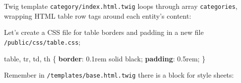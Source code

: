 \documentclass[a4paperpaper,openright]{book}
\newenvironment{Shaded}{}{}
\newcommand{\ConstantTok}[1]{\textcolor[rgb]{0.53,0.00,0.00}{#1}}
\newcommand{\DataTypeTok}[1]{\textcolor[rgb]{0.56,0.13,0.00}{#1}}
\newcommand{\DecValTok}[1]{\textcolor[rgb]{0.25,0.63,0.44}{#1}}
\newcommand{\KeywordTok}[1]{\textcolor[rgb]{0.00,0.44,0.13}{\textbf{#1}}}
\newcommand{\NormalTok}[1]{#1}
\newcommand{\OperatorTok}[1]{\textcolor[rgb]{0.40,0.40,0.40}{#1}}
\newcommand{\OtherTok}[1]{\textcolor[rgb]{0.00,0.44,0.13}{#1}}
\newcommand{\StringTok}[1]{\textcolor[rgb]{0.25,0.44,0.63}{#1}}
\begin{document}
Twig template \texttt{category/index.html.twig} loops through array
\texttt{categories}, wrapping HTML table row tags around each entity's
content:

\begin{Shaded}
\end{Shaded}

Let's create a CSS file for table borders and padding in a new file
\texttt{/public/css/table.css};

\begin{Shaded}
\begin{Highlighting}[]
\NormalTok{    table}\OperatorTok{,}\NormalTok{ tr}\OperatorTok{,}\NormalTok{ td}\OperatorTok{,}\NormalTok{ th \{}
        \KeywordTok{border}\NormalTok{: }\DecValTok{0.1}\DataTypeTok{rem} \DecValTok{solid} \ConstantTok{black}\OperatorTok{;}
        \KeywordTok{padding}\NormalTok{: }\DecValTok{0.5}\DataTypeTok{rem}\OperatorTok{;}
\NormalTok{    \}}
\end{Highlighting}
\end{Shaded}

Remember in \texttt{/templates/base.html.twig} there is a block for
style sheets:

\begin{Shaded}
\end{Shaded}
\end{document}

